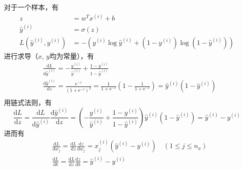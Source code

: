 	\vspace{0.5\baselineskip}
	对于一个样本，有
	\begin{equation}
		\begin{aligned}
		z &= w^T x^{(i)} + b \\
		\hat{y}^{(i)} &= \sigma(z) \\
		L(\hat{y}^{(i)}, y^{(i)}) &= -(y^{(i)} \log \hat{y}^{(i)} + (1 - y^{(i)}) \log (1 - \hat{y}^{(i)}))
		\end{aligned} 
		\label{eq:gradient_logistic_sample}
	\end{equation}
	进行求导（$x$, $y$均为常量），有
	\begin{equation}
		\begin{aligned}
		&\frac{\mathrm{d}L}{\mathrm{d}\hat{y}^{(i)}} = -\frac{y^{(i)}}{\hat{y}^{(i)}} + \frac{1 - y^{(i)}}{1 - \hat{y}^{(i)}} \\
		&\frac{\mathrm{d}\hat{y}^{(i)}}{\mathrm{d}z} = \frac{\mathrm{e}^{-z}}{(1 + \mathrm{e}^{-z})^2} = \frac{1}{1 + \mathrm{e}^{-z}}(1 - \frac{1}{1 + \mathrm{e}^{-z}}) = \hat{y}^{(i)}(1 - \hat{y}^{(i)})\\
		\end{aligned}
	\end{equation}
	用链式法则，有
	\begin{equation}
		\frac{\mathrm{d}L}{\mathrm{d}z} = \frac{\mathrm{d}L}{\mathrm{d}\hat{y}^{(i)}} \frac{\mathrm{d}\hat{y}^{(i)}}{\mathrm{d}z} = (-\frac{y^{(i)}}{\hat{y}^{(i)}} + \frac{1 - y^{(i)}}{1 - \hat{y}^{(i)}})\hat{y}^{(i)}(1 - \hat{y}^{(i)}) = \hat{y}^{(i)} - y^{(i)}
	\end{equation}
	进而有
	\begin{equation}
		\begin{aligned}
		&\frac{\mathrm{d}L}{\mathrm{d}w_j} = \frac{\mathrm{d}L}{\mathrm{d}z} \frac{\mathrm{d}z}{\mathrm{d}w_j} = x_j^{(i)} (\hat{y}^{(i)} - y^{(i)}) \quad (1 \leqslant j \leqslant n_x) \\
		&\frac{\mathrm{d}L}{\mathrm{d}b} = \frac{\mathrm{d}L}{\mathrm{d}z} \frac{\mathrm{d}z}{\mathrm{d}b} = \hat{y}^{(i)} - y^{(i)}
		\end{aligned}
	\end{equation}

